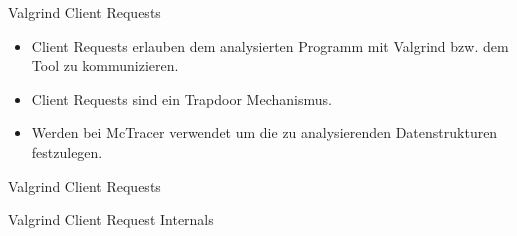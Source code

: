 \begin{frame}{Valgrind Client Requests}
	\begin{itemize}
		\item Client Requests erlauben dem analysierten Programm mit Valgrind bzw. dem Tool zu kommunizieren.
		\pause \item Client Requests sind ein Trapdoor Mechanismus.
		\pause \item Werden bei McTracer verwendet um die zu analysierenden Datenstrukturen festzulegen.
	\end{itemize}

	\pause

	\lstset{frame=single}
	
\end{frame}

\begin{frame}{Valgrind Client Requests}
	\lstset{frame=single}
		
\end{frame}

\begin{frame}{Valgrind Client Request Internals}
	\lstset{frame=single}
		
\end{frame}
